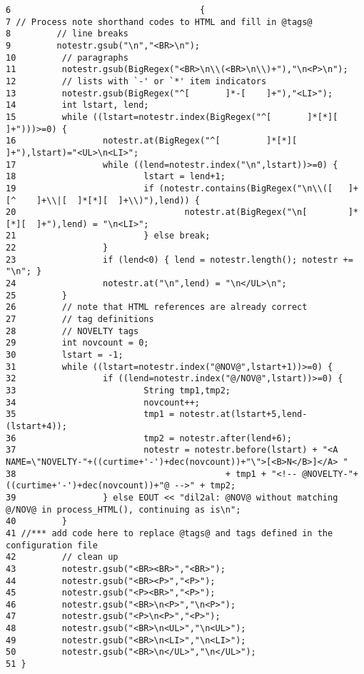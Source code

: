 \footnotesize\begin{verbatim}6                                     {
7 // Process note shorthand codes to HTML and fill in @tags@
8         // line breaks
9         notestr.gsub("\n","<BR>\n");
10         // paragraphs
11         notestr.gsub(BigRegex("<BR>\n\\(<BR>\n\\)+"),"\n<P>\n");
12         // lists with `-' or `*' item indicators
13         notestr.gsub(BigRegex("^[       ]*-[    ]+"),"<LI>");
14         int lstart, lend;
15         while ((lstart=notestr.index(BigRegex("^[       ]*[*][  ]+")))>=0) {
16                 notestr.at(BigRegex("^[         ]*[*][  ]+"),lstart)="<UL>\n<LI>";
17                 while ((lend=notestr.index("\n",lstart))>=0) {
18                         lstart = lend+1;
19                         if (notestr.contains(BigRegex("\n\\([   ]+[^    ]+\\|[  ]*[*][  ]+\\)"),lend)) {
20                                 notestr.at(BigRegex("\n[        ]*[*][  ]+"),lend) = "\n<LI>";
21                         } else break;
22                 }
23                 if (lend<0) { lend = notestr.length(); notestr += "\n"; }
24                 notestr.at("\n",lend) = "\n</UL>\n";
25         }
26         // note that HTML references are already correct
27         // tag definitions
28         // NOVELTY tags
29         int novcount = 0;
30         lstart = -1;
31         while ((lstart=notestr.index("@NOV@",lstart+1))>=0) {
32                 if ((lend=notestr.index("@/NOV@",lstart))>=0) {
33                         String tmp1,tmp2;
34                         novcount++;
35                         tmp1 = notestr.at(lstart+5,lend-(lstart+4));
36                         tmp2 = notestr.after(lend+6);
37                         notestr = notestr.before(lstart) + "<A NAME=\"NOVELTY-"+((curtime+'-')+dec(novcount))+"\">[<B>N</B>]</A> "
38                                         + tmp1 + "<!-- @NOVELTY-"+((curtime+'-')+dec(novcount))+"@ -->" + tmp2;
39                 } else EOUT << "dil2al: @NOV@ without matching @/NOV@ in process_HTML(), continuing as is\n";
40         }
41 //*** add code here to replace @tags@ and tags defined in the configuration file
42         // clean up
43         notestr.gsub("<BR><BR>","<BR>");
44         notestr.gsub("<BR><P>","<P>");
45         notestr.gsub("<P><BR>","<P>");
46         notestr.gsub("<BR>\n<P>","\n<P>");
47         notestr.gsub("<P>\n<P>","<P>");
48         notestr.gsub("<BR>\n<UL>","\n<UL>");
49         notestr.gsub("<BR>\n<LI>","\n<LI>");
50         notestr.gsub("<BR>\n</UL>","\n</UL>");
51 }
\end{verbatim}\normalsize 
{}
